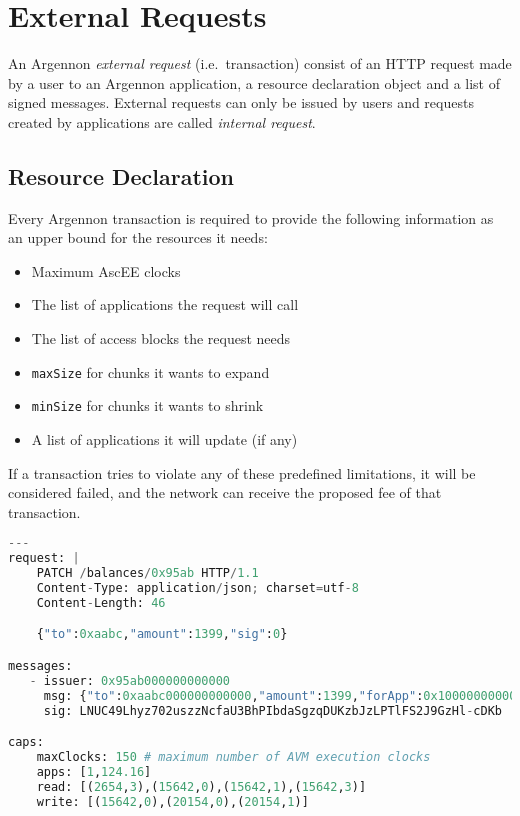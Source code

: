 

\section{External Requests}\label{sec:transactions}

An Argennon \emph{external request} (i.e.\ transaction) consist of an HTTP request made by a user to an Argennon application, a
resource declaration object and a list of signed messages. External requests can only be
issued by users and requests created by applications are called \emph{internal request}.

\subsection{Resource Declaration}\label{subsec:resource-declaration}

Every Argennon transaction is required to provide the following information as an upper bound for the
resources it needs:

\begin{itemize}
    \item Maximum AscEE clocks
    \item The list of applications the request will call
    \item The list of access blocks the request needs
    \item \texttt{maxSize} for chunks it wants to expand
    \item \texttt{minSize} for chunks it wants to shrink
    \item A list of applications it will update (if any)
\end{itemize}

If a transaction tries to violate any of these predefined limitations, it will be considered failed, and the network
can receive the proposed fee of that transaction.

\begin{lstlisting}[language=python, frame=TB, float, title=An Argennon transaction in YAML format,
    label={lst:txn-example}]
---
request: |
    PATCH /balances/0x95ab HTTP/1.1
    Content-Type: application/json; charset=utf-8
    Content-Length: 46

    {"to":0xaabc,"amount":1399,"sig":0}

messages:
   - issuer: 0x95ab000000000000
     msg: {"to":0xaabc000000000000,"amount":1399,"forApp":0x100000000000000,"nonce":11}
     sig: LNUC49Lhyz702uszzNcfaU3BhPIbdaSgzqDUKzbJzLPTlFS2J9GzHl-cDKb

caps:
    maxClocks: 150 # maximum number of AVM execution clocks
    apps: [1,124.16]
    read: [(2654,3),(15642,0),(15642,1),(15642,3)]
    write: [(15642,0),(20154,0),(20154,1)]
\end{lstlisting}


